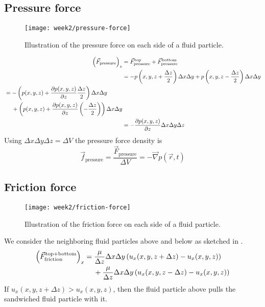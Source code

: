 \subsection{Pressure force}
\begin{figure}[!h]
    \centering
    \texttt{[image: week2/pressure-force]}
    \caption{Illustration of the pressure force on each side of a fluid particle.}
    \label{fig:pressure-force}
\end{figure}
\begin{align}
\left(\vec{F}_\mathrm{pressure}\right)_z &= \vec{F}_\mathrm{pressure}^\mathrm{top} + \vec{F}_\mathrm{pressure}^\mathrm{bottom}\\
&= -p\left(x,y,z+\frac{\Delta z}{2}\right)\Delta x \Delta y + p\left(x,y,z-\frac{\Delta z}{2}\right)\Delta x \Delta y \\
\begin{split}&= -\left(p(x,y,z)+\frac{\partial p(x,y,z)}{\partial z}\frac{\Delta z}{2}\right)\Delta x \Delta y\\
&\hspace{4.5mm}+ \left(p(x,y,z)+\frac{\partial p(x,y,z)}{\partial z}\left(-\frac{\Delta z}{2}\right)\right)\Delta x \Delta y
\end{split}\\
&= -\frac{\partial p(x,y,z)}{\partial z} \Delta x \Delta y \Delta z
\end{align}
Using $\Delta x \Delta y \Delta z = \Delta V$ the pressure force density is
\begin{equation}
\vec{f} _\mathrm{pressure} = \frac{\vec{F}_\mathrm{pressure}}{\Delta V} = -\vec{\nabla}p(\vec{r},t)
\end{equation}

\subsection{Friction force}
\begin{figure}[!h]
    \centering
    \texttt{[image: week2/friction-force]}
    \caption{Illustration of the friction force on each side of a fluid particle.}
    \label{fig:friction-force}
\end{figure}

We consider the neighboring fluid particles above and below as sketched in .
\begin{equation}
\begin{split}
\left(\vec{F}_\mathrm{friction}^\mathrm{top+bottom}\right)_x &= \frac{\mu}{\Delta z}\Delta x \Delta y \left(u_x(x,y,z+\Delta z)-u_x(x,y,z)\right) \\
&\hspace{4.5mm}+ \frac{\mu}{\Delta z}\Delta x \Delta y \left(u_x(x,y,z-\Delta z)-u_x(x,y,z)\right)
\end{split}
\end{equation}
If $u_x(x,y,z+\Delta z)>u_x(x,y,z)$, then the fluid particle above pulls the sandwiched fluid particle with it.

